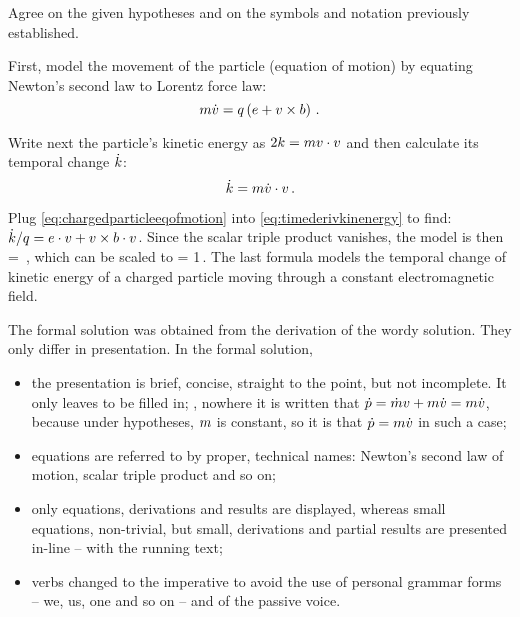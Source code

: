 Agree on the given hypotheses and on the symbols and notation previously established.

First, model the movement of the particle (equation of motion) by equating Newton's second law to Lorentz force law:
%
\begin{equation}\label{eq:chargedparticleeqofmotion}
  m\dot{v} = q\left({e + v\times b}\right)\,.
\end{equation}

Write next the particle's kinetic energy as $2k = mv\cdot v$ and then calculate its temporal change $\dot{k}$:
%
\begin{equation}\label{eq:timederivkinenergy}
  \dot{k} = m\dot{v}\cdot v\,.
\end{equation}

Plug \cref{eq:chargedparticleeqofmotion} into \cref{eq:timederivkinenergy} to find: $\dot{k}/q = e\cdot v + v\times b\cdot v$. Since the scalar triple product vanishes, the model is then
%
\beq
  \dt\ekin = \echarge\efield\iprod\vel\,,
\eeq
%
which can be scaled to 
\beq
  \dfrac{\dt\ekin}{\echarge\efield\iprod\vel} = 1\,.
\eeq
%
The last formula models the temporal change of kinetic energy of a charged particle moving through a constant electromagnetic field.

The formal solution was obtained from the derivation of the wordy solution. They only differ in presentation. In the formal solution,
%
\begin{itemize}
%
\item the presentation is brief, concise, straight to the point, but not incomplete. It only leaves  to be filled in; \eg, nowhere it is written that $\dot{p} = \dot{m}v + m\dot{v} = m\dot{v}$, because under hypotheses, $m$ is constant, so it is  that $\dot{p} = m\dot{v}$ in such a case;
%
\item equations are referred to by proper, technical names: Newton's second law of motion, scalar triple product and so on;
%
\item only  equations, derivations and results are displayed, whereas small equations, non-trivial, but small, derivations and partial results are presented in-line -- with the running text;
%
\item verbs changed to the imperative to avoid the use of personal grammar forms -- we, us, one and so on -- and of the passive voice.
%
\end{itemize}


